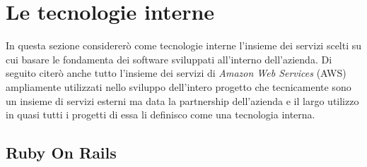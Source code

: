\documentclass[target=bach,aauheader=,style=]{thud}
\begin{document}
\section{Le tecnologie interne}

In questa sezione considererò come tecnologie interne l'insieme dei servizi scelti su cui basare le fondamenta dei software
sviluppati all'interno dell'azienda. Di seguito citerò anche tutto l'insieme dei servizi di \textit{Amazon Web Services}\cite{aws} (AWS)
ampliamente utilizzati nello sviluppo dell'intero progetto che tecnicamente sono un insieme di servizi esterni ma data la partnership dell'azienda
e il largo utilizzo in quasi tutti i progetti di essa li definisco come una tecnologia interna.

\subsection{Ruby On Rails}
\end{document}
